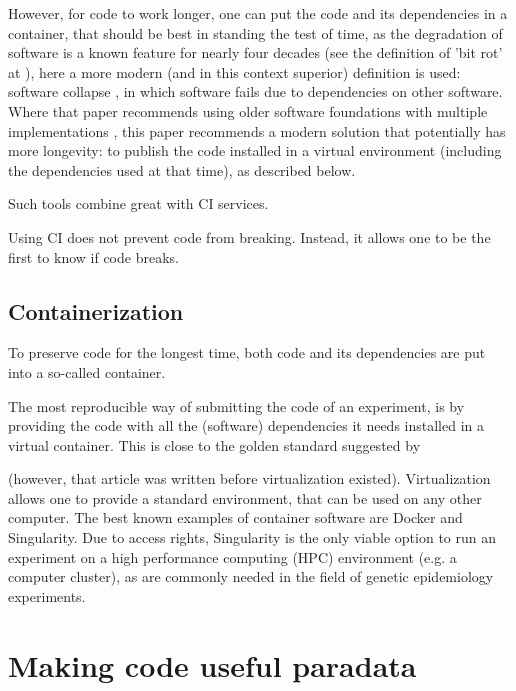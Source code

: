 However, for code to work longer, one can put the code and its dependencies in
a container, that should be best in standing the test of time,
as the degradation of software is a known feature for nearly 
four decades (see the definition of 'bit rot' at \cite{steele1983hacker}),
here a more modern (and in this context superior)
definition is used: software collapse \cite{hinsen2019dealing},
in which software fails due to dependencies on other 
software.
Where that paper recommends using older software foundations 
with multiple implementations \cite{hinsen2019dealing},
this paper recommends a modern solution that potentially has more 
longevity:
to publish the code installed in a virtual environment
(including the dependencies used at that time), as described below.

Such tools combine great with CI services.

Using CI does not prevent code from breaking. Instead,
it allows one to be the first to know if code breaks.

\subsection{Containerization}

To preserve code for the longest time, 
both code and its dependencies are put into a so-called container.

The most reproducible way of submitting the code of an experiment,
is by providing the code with all the (software) dependencies 
it needs installed in a virtual container.
This is close to the golden standard suggested by 
\cite{peng2011reproducible} 

(however, that article was written before virtualization existed).
Virtualization allows one to provide a standard environment,
that can be used on any other computer.
The best known examples of container software are Docker and Singularity.
Due to access rights, Singularity is the only viable option to run
an experiment on a 
high performance computing (HPC) environment (e.g. a computer cluster),
as are commonly needed in the field of genetic epidemiology experiments.

\section{Making code useful paradata}\label{sec:making-code-useful-paradata}

